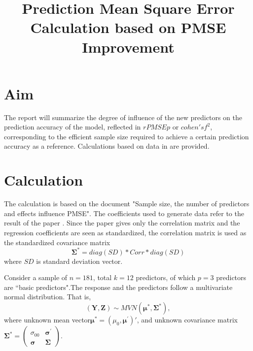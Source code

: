 \documentclass[11pt]{article}
\begin{document}
\thispagestyle{fancy}

\title{\bf Prediction Mean Square Error Calculation based on PMSE Improvement}
\date{}
\maketitle
% 
%
%
%
%
%

\section{Aim}

The report will summarize the degree of influence of the new predictors on the prediction accuracy of the model, reflected in $rPMSEp$ or $cohen's f^2$, corresponding to the efficient sample size required to achieve a certain prediction accuracy as a reference. Calculations based on data in \cite{baker2008chronicpain} are provided.




   
\section{Calculation}

The calculation is based on the document "Sample size, the number of predictors and effects influence PMSE". The coefficients used to generate data refer to the result of the paper  \cite{baker2008chronicpain}. Since the paper gives only the correlation matrix and the regression coefficients are seen as standardized, the correlation matrix is used as the standardized covariance matrix $$\bm{\Sigma}^* = diag(SD)*Corr*diag(SD)$$
where $SD$ is standard deviation vector.


Consider a sample of $n=181$,  total $k=12$ predictors, of which $p=3$ predictors are ``basic predictors".The response and the predictors follow a multivariate normal distribution. That is, 
$$
(\boldsymbol{Y}, \boldsymbol{Z}) \sim MVN(\boldsymbol{\mu^*}, \boldsymbol{\Sigma}^*),
$$
where unknown mean vector$\boldsymbol{\mu^{*}}=(\mu_{0},\boldsymbol{\mu^{'}})'$, and unknown covariance matrix 
$ \boldsymbol{\Sigma^{*}}  =    
 \begin{pmatrix} 
    \sigma_{00} & \boldsymbol{\sigma^{'}} \\  
    \boldsymbol{\sigma} & \boldsymbol{\Sigma}
\end{pmatrix}$. 
\end{document}
